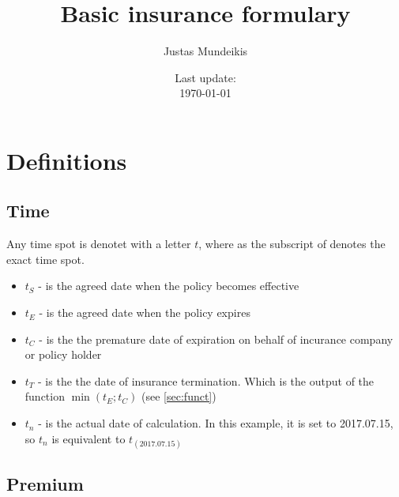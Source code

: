 \documentclass[11pt,a4paper,fleqn]{article}      %
\begin{document}
\begin{titlepage}
\title{Basic insurance formulary}
\author{Justas Mundeikis}
\date{Last update:\\ \today}
\maketitle
\thispagestyle{empty}
\vspace{0.5cm}


\end{titlepage}
\clearpage

 
 
\newpage

\section{Definitions}

\subsection{Time}
Any time spot is denotet with a letter $t$, where as the subscript of denotes the exact time spot. 
\begin{itemize}
\item $t_{S}$ - is the agreed date when the policy becomes effective
\item $t_{E}$ - is the agreed date when the policy expires
\item $t_{C}$ - is the the premature date of expiration on behalf of incurance company or policy holder
\item $t_{T}$ - is the the date of insurance termination. Which is the output of the function $\min(t_E; t_C)$ (see \ref{sec:funct})
\item $t_{n}$ - is the actual date of calculation. In this example, it is set to 2017.07.15, so $t_n$ is equivalent to $t_{(2017.07.15)}$
\end{itemize}



\subsection{Premium}
\end{document}
